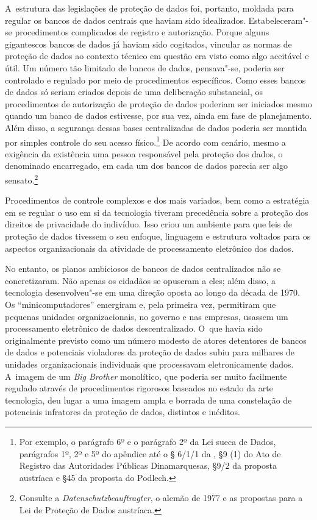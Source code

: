 A~estrutura das legislações de proteção de dados foi, portanto, moldada
para regular os bancos de dados centrais que haviam sido idealizados.
Estabeleceram"-se procedimentos complicados de registro e autorização.
Porque alguns gigantescos bancos de dados já haviam sido cogitados,
vincular as normas de proteção de dados ao contexto técnico em questão
era visto como algo aceitável e útil. Um número tão limitado de bancos
de dados, pensava"-se, poderia ser controlado e regulado por meio de
procedimentos específicos. Como esses bancos de dados só seriam criados
depois de uma deliberação substancial, os procedimentos de autorização
de proteção de dados poderiam ser iniciados mesmo quando um banco de
dados estivesse, por sua vez, ainda em fase de planejamento. Além disso,
a segurança dessas bases centralizadas de dados poderia ser mantida por
simples controle do seu acesso físico.\footnote{Por exemplo, o parágrafo
  6º e o parágrafo 2º da Lei sueca de Dados, parágrafos 1º, 2º e 5º do
  apêndice até o § 6/1/1 da , §9 (1) do Ato de Registro das
  Autoridades Públicas Dinamarquesas, §9/2 da proposta austríaca e §45
  da proposta do Podlech.} De acordo com cenário, mesmo a exigência da
existência uma pessoa responsável pela proteção dos dados, o denominado
encarregado, em cada um dos bancos de dados parecia ser algo
sensato.\footnote{Consulte a \emph{Datenschutzbeauftragter}, o alemão
   de 1977 e as propostas para a Lei de Proteção de Dados austríaca.}

Procedimentos de controle complexos e dos mais variados, bem como a
estratégia em se regular o uso em si da tecnologia tiveram precedência
sobre a proteção dos direitos de privacidade do indivíduo. Isso criou um
ambiente para que leis de proteção de dados tivessem o seu enfoque,
linguagem e estrutura voltados para os aspectos organizacionais da
atividade de processamento eletrônico dos dados.

No entanto, os planos ambiciosos de bancos de dados centralizados não se
concretizaram. Não apenas os cidadãos se opuseram a eles; além disso, a
tecnologia desenvolveu"-se em uma direção oposta ao longo da década de
1970. Os ``minicomputadores'' emergiram e, pela primeira vez, permitiram
que pequenas unidades organizacionais, no governo e nas empresas,
usassem um processamento eletrônico de dados descentralizado. O~que
havia sido originalmente previsto como um número modesto de atores
detentores de bancos de dados e potenciais violadores da proteção de
dados subiu para milhares de unidades organizacionais individuais que
processavam eletronicamente dados. A~imagem de um \emph{Big Brother}
monolítico\emph{,} que poderia ser muito facilmente regulado através de
procedimentos rigorosos baseados no estado da arte tecnologia, deu lugar
a uma imagem ampla e borrada de uma constelação de potenciais infratores
da proteção de dados, distintos e inéditos.


